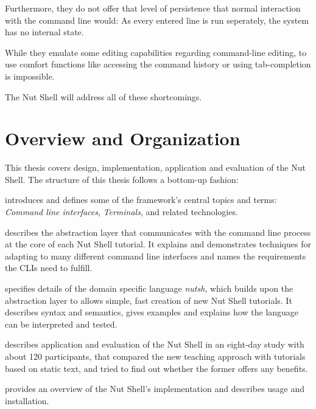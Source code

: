 \documentclass[paper=a4,twoside,abstract=on,cleardoublepage=empty,numbers=noenddot,toc=bib,11pt,appendixprefix=true]{scrreprt}
\begin{document}
Furthermore, they do not offer that level of persistence that normal interaction with the command line would: As every entered line is run seperately, the system has no internal state.

While they emulate some editing capabilities regarding command-line editing, to use comfort functions like accessing the command history or using tab-completion is impossible.

The Nut Shell will address all of these shortcomings.

\section{Overview and Organization}



This thesis covers design, implementation, application and evaluation of the Nut Shell. The structure of this thesis follows a bottom-up fashion:

 introduces and defines some of the framework's central topics and terms: \emph{Command line interfaces}, \emph{Terminals}, and related technologies.

 describes the abstraction layer that communicates with the command line process at the core of each Nut Shell tutorial. It explains and demonstrates techniques for adapting to many different command line interfaces and names the requirements the CLIs need to fulfill.

 specifies details of the domain specific language \emph{nutsh}, which builds upon the abstraction layer to allows simple, fast creation of new Nut Shell tutorials. It describes syntax and semantics, gives examples and explains how the language can be interpreted and tested.

 describes application and evaluation of the Nut Shell in an eight-day study with about 120 participants, that compared the new teaching approach with tutorials based on static text, and tried to find out whether the former offers any benefits.

 provides an overview of the Nut Shell's implementation and describes usage and installation.
\end{document}
